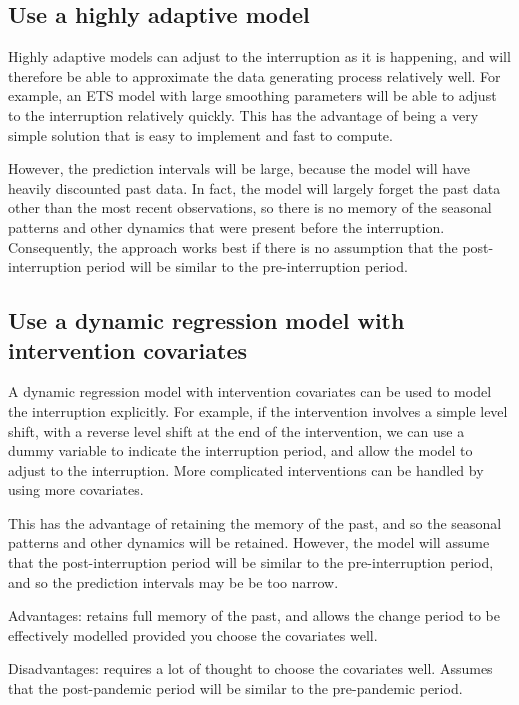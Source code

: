 \documentclass[11pt,a4paper,]{article}
\begin{document}
\subsection{Use a highly adaptive
model}\label{use-a-highly-adaptive-model}

Highly adaptive models can adjust to the interruption as it is
happening, and will therefore be able to approximate the data generating
process relatively well. For example, an ETS model with large smoothing
parameters will be able to adjust to the interruption relatively
quickly. This has the advantage of being a very simple solution that is
easy to implement and fast to compute.

However, the prediction intervals will be large, because the model will
have heavily discounted past data. In fact, the model will largely
forget the past data other than the most recent observations, so there
is no memory of the seasonal patterns and other dynamics that were
present before the interruption. Consequently, the approach works best
if there is no assumption that the post-interruption period will be
similar to the pre-interruption period.

\subsection{Use a dynamic regression model with intervention
covariates}\label{use-a-dynamic-regression-model-with-intervention-covariates}

A dynamic regression model with intervention covariates can be used to
model the interruption explicitly. For example, if the intervention
involves a simple level shift, with a reverse level shift at the end of
the intervention, we can use a dummy variable to indicate the
interruption period, and allow the model to adjust to the interruption.
More complicated interventions can be handled by using more covariates.

This has the advantage of retaining the memory of the past, and so the
seasonal patterns and other dynamics will be retained. However, the
model will assume that the post-interruption period will be similar to
the pre-interruption period, and so the prediction intervals may be be
too narrow.

Advantages: retains full memory of the past, and allows the change
period to be effectively modelled provided you choose the covariates
well.

Disadvantages: requires a lot of thought to choose the covariates well.
Assumes that the post-pandemic period will be similar to the
pre-pandemic period.
\end{document}
